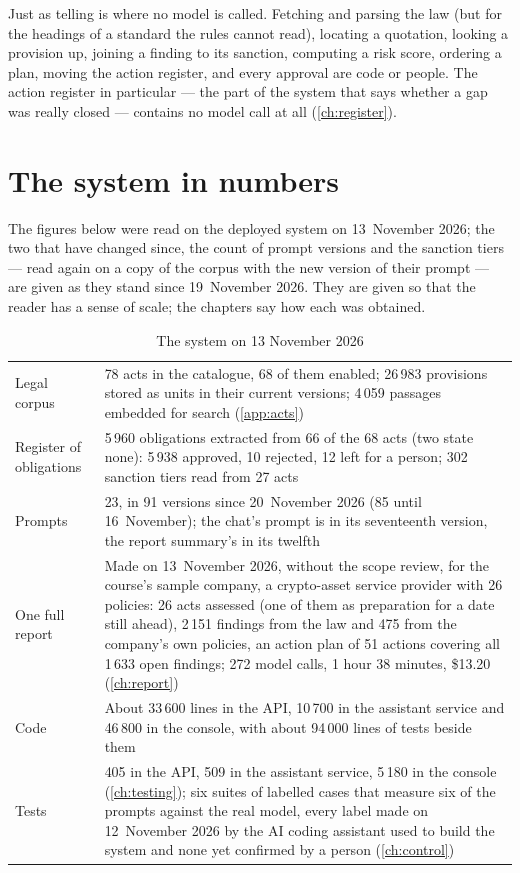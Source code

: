 Just as telling is where no model is called. Fetching and parsing the law (but for the
headings of a standard the rules cannot read), locating a quotation, looking a provision up, joining a finding to its sanction, computing a risk score,
ordering a plan, moving the action register, and every approval are code or people. The
action register in particular --- the part of the system that says whether a gap was really
closed --- contains no model call at all (\cref{ch:register}).

\section{The system in numbers}\label{sec:intro:numbers}

The figures below were read on the deployed system on 13~November 2026; the two that have
changed since, the count of prompt versions and the sanction tiers --- read again on a copy
of the corpus with the new version of their prompt --- are given as they stand since
19~November 2026.
They are given so that the reader has a sense of scale; the chapters say how each was obtained.

\begin{table}[H]
\caption{The system on 13 November 2026}\label{tab:intro:numbers}
\begin{tabularx}{\textwidth}{@{}L{44mm}Y@{}}
\toprule
{} &  \\
\midrule
Legal corpus & 78 acts in the catalogue, 68 of them enabled; 26\,983 provisions stored as units in
  their current versions; 4\,059 passages embedded for search (\cref{app:acts}) \\
Register of obligations & 5\,960 obligations extracted from 66 of the 68 acts (two state none): 5\,938 approved,
  10 rejected, 12 left for a person; 302 sanction tiers read from 27 acts \\
Prompts & 23, in 91 versions since 20~November 2026 (85 until 16~November); the chat's prompt is in
  its seventeenth version, the report summary's in its twelfth \\
One full report & Made on 13~November 2026, without the scope review, for the course's sample company, a crypto-asset service
  provider with 26 policies: 26 acts assessed (one of them as preparation for a date still
  ahead), 2\,151 findings from the law and 475 from the company's own policies, an action plan of 51 actions covering all 1\,633 open findings;
  272 model calls, 1 hour 38 minutes, \$13.20 (\cref{ch:report}) \\
Code & About 33\,600 lines in the API, 10\,700 in the assistant service and 46\,800 in the
  console, with about 94\,000 lines of tests beside them \\
Tests & 405 in the API, 509 in the assistant service, 5\,180 in the console
  (\cref{ch:testing}); six suites of labelled cases that measure six of the prompts against
  the real model, every label made on 12~November 2026 by the AI coding assistant used to
  build the system and none yet confirmed by a person (\cref{ch:control}) \\
\bottomrule
\end{tabularx}
\end{table}

